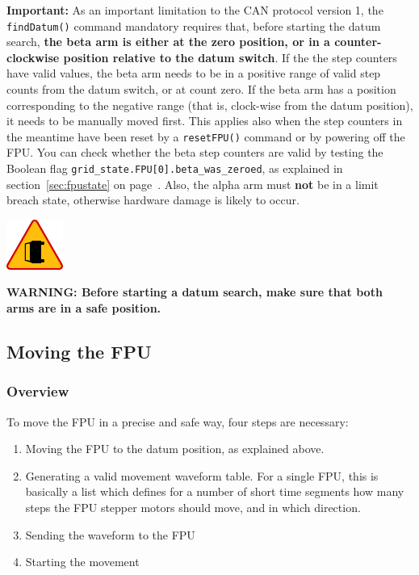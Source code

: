 \documentclass[11pt,a4paper]{report}
\newenvironment{warning}{\begin{framed}\includegraphics[width=5em]{accident-area-ahead.png}
}{\end{framed}}
\begin{document}
\textbf{Important:} As an important limitation to the CAN protocol
version 1, the \texttt{findDatum()} command mandatory requires that,
before starting the datum search, \textbf{the beta arm is either at
  the zero position, or in a counter-clockwise position relative to
  the datum switch}. If the the step counters have valid values, the
beta arm needs to be in a positive range of valid step counts from the
datum switch, or at count zero. If the beta arm has a position
corresponding to the negative range (that is, clock-wise from the
datum position), it needs to be manually moved first.  This applies
also when the step counters in the meantime have been reset by a
\texttt{resetFPU()} command or by powering off the FPU. You can check
whether the beta step counters are valid by testing the Boolean flag
\verb+grid_state.FPU[0].beta_was_zeroed+, as explained in
section~\ref{sec:fpustate} on page~\pageref{sec:fpustate}. Also, the
alpha arm must \textbf{not} be in a limit breach state, otherwise
hardware damage is likely to occur.
\begin{warning}
  \textbf{WARNING: Before starting a datum search, make sure that both
    arms are in a safe position.}
\end{warning}

\subsection{Moving the FPU}
\subsubsection{Overview}
To move the FPU in a precise and safe way, four steps are necessary:

\begin{enumerate}
\item Moving the FPU to the datum position, as explained above.

\item Generating a valid movement waveform table. For a single FPU,
  this is basically a list which defines for a number of short time
  segments how many steps the FPU stepper motors should move, and in
  which direction.

\item Sending the waveform to the FPU
\item Starting the movement
  
\end{enumerate}
\end{document}
